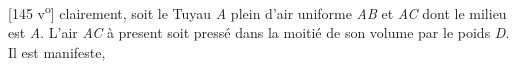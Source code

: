 [145 v\textsuperscript{o}] clairement, soit le Tuyau \textit{A} plein d'air uniforme 
                     \textit{AB} et \textit{AC} dont le milieu est \textit{A}. L'air \textit{AC} \`{a} present soit press\'{e} 
                        dans la moiti\'{e} de son volume  par le poids\protect{} \textit{D}. Il est manifeste, 
